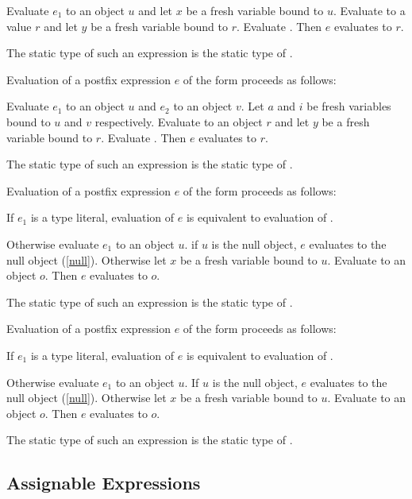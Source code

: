 \documentclass{article}
\begin{document}
\LMHash{}
Evaluate $e_1$ to an object $u$ and let $x$ be a fresh variable bound to $u$.
Evaluate  to a value $r$
and let $y$ be a fresh variable bound to $r$.
Evaluate .
Then $e$ evaluates to $r$.

\LMHash{}
The static type of such an expression is the static type of .

\LMHash{}
Evaluation of a postfix expression $e$ of the form 
proceeds as follows:

\LMHash{}
Evaluate $e_1$ to an object $u$ and $e_2$ to an object $v$.
Let $a$ and $i$ be fresh variables bound to $u$ and $v$ respectively.
Evaluate  to an object $r$
and let $y$ be a fresh variable bound to $r$.
Evaluate .
Then $e$ evaluates to $r$.

\LMHash{}
The static type of such an expression is the static type of .

\LMHash{}
Evaluation of a postfix expression $e$ of the form 
proceeds as follows:

\LMHash{}
If $e_1$ is a type literal, evaluation of $e$ is equivalent to
evaluation of .

\LMHash{}
Otherwise evaluate $e_1$ to an object $u$.
if $u$ is the null object, $e$ evaluates to the null object (\ref{null}).
Otherwise let $x$ be a fresh variable bound to $u$.
Evaluate  to an object $o$.
Then $e$ evaluates to $o$.

\LMHash{}
The static type of such an expression is the static type of .

\LMHash{}
Evaluation of a postfix expression $e$ of the form 
proceeds as follows:

If $e_1$ is a type literal, evaluation of $e$ is equivalent to
evaluation of .

Otherwise evaluate $e_1$ to an object $u$.
If $u$ is the null object, $e$ evaluates to the null object (\ref{null}).
Otherwise let $x$ be a fresh variable bound to $u$.
Evaluate  to an object $o$.
Then $e$ evaluates to $o$.

\LMHash{}
The static type of such an expression is the static type of .


\subsection{Assignable Expressions}
\end{document}
